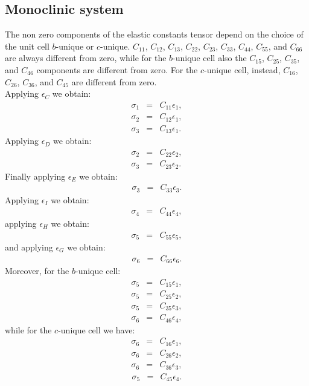 \documentclass[12pt,a4paper,twoside]{report}
\begin{document}
{\color{web-blue}\subsection{Monoclinic system}}
\color{black}

The non zero components of the elastic constants tensor depend on the choice
of the unit cell $b$-unique or $c$-unique. 
$C_{11}$, $C_{12}$, $C_{13}$, $C_{22}$, $C_{23}$, $C_{33}$, $C_{44}$, 
$C_{55}$, and $C_{66}$ are always different from zero, while for the
$b$-unique cell also the $C_{15}$, $C_{25}$, $C_{35}$, and $C_{46}$ components
are different from zero. For the $c$-unique cell, instead, $C_{16}$, $C_{26}$, 
$C_{36}$, and $C_{45}$ are different from zero. \\
Applying $\epsilon_C$ we obtain:
\begin{eqnarray}
\sigma_1&=&C_{11} \epsilon_1,  \\
\sigma_2&=&C_{12} \epsilon_1,  \\
\sigma_3&=&C_{13} \epsilon_1.  
\end{eqnarray}
Applying $\epsilon_D$ we obtain:
\begin{eqnarray}
\sigma_2&=&C_{22} \epsilon_2,  \\
\sigma_3&=&C_{23} \epsilon_2.  
\end{eqnarray}
Finally applying $\epsilon_E$ we obtain:
\begin{eqnarray}
\sigma_3&=&C_{33} \epsilon_3.
\end{eqnarray}
Applying $\epsilon_I$ we obtain:
\begin{eqnarray}
\sigma_4&=&C_{44} \epsilon_4,
\end{eqnarray}
applying $\epsilon_H$ we obtain:
\begin{eqnarray}
\sigma_5&=&C_{55} \epsilon_5,
\end{eqnarray}
and applying $\epsilon_G$ we obtain:
\begin{eqnarray}
\sigma_6&=&C_{66} \epsilon_6. 
\end{eqnarray}
Moreover, for the $b$-unique cell: 
\begin{eqnarray}
\sigma_5&=&C_{15} \epsilon_1,
\end{eqnarray}
\begin{eqnarray}
\sigma_5&=&C_{25} \epsilon_2,
\end{eqnarray}
\begin{eqnarray}
\sigma_5&=&C_{35} \epsilon_3,
\end{eqnarray}
\begin{eqnarray}
\sigma_6&=&C_{46} \epsilon_4,
\end{eqnarray}
while for the $c$-unique cell we have:
\begin{eqnarray}
\sigma_6&=&C_{16} \epsilon_1,
\end{eqnarray}
\begin{eqnarray}
\sigma_6&=&C_{26} \epsilon_2,
\end{eqnarray}
\begin{eqnarray}
\sigma_6&=&C_{36} \epsilon_3,
\end{eqnarray}
\begin{eqnarray}
\sigma_5&=&C_{45} \epsilon_4.
\end{eqnarray}
\end{document}
